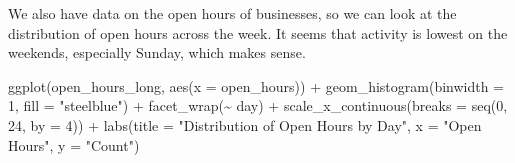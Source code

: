 \documentclass[
  12pt,
  letterpaper,
  DIV=11,
  numbers=noendperiod]{scrartcl}
\newenvironment{Shaded}{\begin{snugshade}}{\end{snugshade}}
\newcommand{\AttributeTok}[1]{\textcolor[rgb]{0.98,0.46,0.51}{#1}}
\newcommand{\DecValTok}[1]{\textcolor[rgb]{0.47,0.72,1.00}{#1}}
\newcommand{\FunctionTok}[1]{\textcolor[rgb]{0.70,0.57,0.94}{#1}}
\newcommand{\NormalTok}[1]{\textcolor[rgb]{0.88,0.89,0.91}{#1}}
\newcommand{\OtherTok}[1]{\textcolor[rgb]{0.70,0.57,0.94}{#1}}
\newcommand{\SpecialCharTok}[1]{\textcolor[rgb]{0.47,0.72,1.00}{#1}}
\newcommand{\StringTok}[1]{\textcolor[rgb]{0.62,0.80,1.00}{#1}}
\begin{document}
\begin{Shaded}
\end{Shaded}

We also have data on the open hours of businesses, so we can look at the
distribution of open hours across the week. It seems that activity is
lowest on the weekends, especially Sunday, which makes sense.

\begin{Shaded}
\begin{Highlighting}[]
\FunctionTok{ggplot}\NormalTok{(open\_hours\_long, }\FunctionTok{aes}\NormalTok{(}\AttributeTok{x =}\NormalTok{ open\_hours)) }\SpecialCharTok{+}
  \FunctionTok{geom\_histogram}\NormalTok{(}\AttributeTok{binwidth =} \DecValTok{1}\NormalTok{, }\AttributeTok{fill =} \StringTok{"steelblue"}\NormalTok{) }\SpecialCharTok{+}
  \FunctionTok{facet\_wrap}\NormalTok{(}\SpecialCharTok{\textasciitilde{}}\NormalTok{ day) }\SpecialCharTok{+}
  \FunctionTok{scale\_x\_continuous}\NormalTok{(}\AttributeTok{breaks =} \FunctionTok{seq}\NormalTok{(}\DecValTok{0}\NormalTok{, }\DecValTok{24}\NormalTok{, }\AttributeTok{by =} \DecValTok{4}\NormalTok{)) }\SpecialCharTok{+}
  \FunctionTok{labs}\NormalTok{(}\AttributeTok{title =} \StringTok{"Distribution of Open Hours by Day"}\NormalTok{, }\AttributeTok{x =} \StringTok{"Open Hours"}\NormalTok{, }\AttributeTok{y =} \StringTok{"Count"}\NormalTok{)}
\end{Highlighting}
\end{Shaded}
\end{document}

